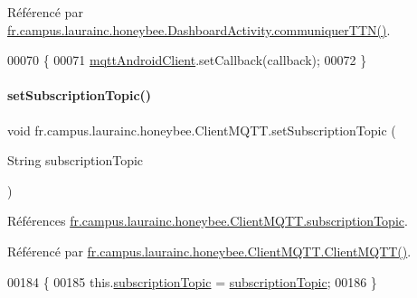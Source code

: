 Référencé par \hyperlink{classfr_1_1campus_1_1laurainc_1_1honeybee_1_1_dashboard_activity_abfefd572745e1034a025bc836812ae4f}{fr.\+campus.\+laurainc.\+honeybee.\+Dashboard\+Activity.\+communiquer\+T\+T\+N()}.


\begin{DoxyCode}
00070                                                            \{
00071         \hyperlink{classfr_1_1campus_1_1laurainc_1_1honeybee_1_1_client_m_q_t_t_a587a9b6c785448cf3e37dc92bcac7961}{mqttAndroidClient}.setCallback(callback);
00072     \}
\end{DoxyCode}
\mbox{\label{classfr_1_1campus_1_1laurainc_1_1honeybee_1_1_client_m_q_t_t_af30038554905358c24a7226544822ff3}} 
\paragraph{\texorpdfstring{set\+Subscription\+Topic()}{setSubscriptionTopic()}}
{\footnotesize\ttfamily void fr.\+campus.\+laurainc.\+honeybee.\+Client\+M\+Q\+T\+T.\+set\+Subscription\+Topic (\begin{DoxyParamCaption}\item[{String}]{subscription\+Topic }\end{DoxyParamCaption})}



Références \hyperlink{classfr_1_1campus_1_1laurainc_1_1honeybee_1_1_client_m_q_t_t_a8771380740ea2e139b595f5b8fa7e0a5}{fr.\+campus.\+laurainc.\+honeybee.\+Client\+M\+Q\+T\+T.\+subscription\+Topic}.



Référencé par \hyperlink{classfr_1_1campus_1_1laurainc_1_1honeybee_1_1_client_m_q_t_t_a98cc7dce4cade9ffacfa462fe2f97088}{fr.\+campus.\+laurainc.\+honeybee.\+Client\+M\+Q\+T\+T.\+Client\+M\+Q\+T\+T()}.


\begin{DoxyCode}
00184                                                                \{
00185         this.\hyperlink{classfr_1_1campus_1_1laurainc_1_1honeybee_1_1_client_m_q_t_t_a8771380740ea2e139b595f5b8fa7e0a5}{subscriptionTopic} = \hyperlink{classfr_1_1campus_1_1laurainc_1_1honeybee_1_1_client_m_q_t_t_a8771380740ea2e139b595f5b8fa7e0a5}{subscriptionTopic};
00186     \}
\end{DoxyCode}
\mbox{\label{classfr_1_1campus_1_1laurainc_1_1honeybee_1_1_client_m_q_t_t_a4c5ae1bb188b2f3c770ab6112b7d8590}} 
